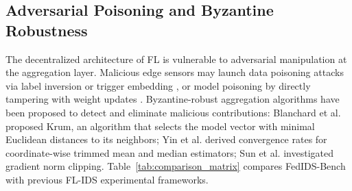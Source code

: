 \documentclass[runningheads]{llncs}
\begin{document}
\subsection{Adversarial Poisoning and Byzantine Robustness}
The decentralized architecture of FL is vulnerable to adversarial manipulation at the aggregation layer. Malicious edge sensors may launch data poisoning attacks via label inversion or trigger embedding \cite{bagdasaryan2020backdoor,tolpegin2020data}, or model poisoning by directly tampering with weight updates \cite{bhagoji2019analyzing,fang2020local}. Byzantine-robust aggregation algorithms have been proposed to detect and eliminate malicious contributions: Blanchard et al. \cite{blanchard2017machine} proposed Krum, an algorithm that selects the model vector with minimal Euclidean distances to its neighbors; Yin et al. \cite{yin2018byzantine} derived convergence rates for coordinate-wise trimmed mean and median estimators; Sun et al. \cite{sun2019can} investigated gradient norm clipping. Table~\ref{tab:comparison_matrix} compares FedIDS-Bench with previous FL-IDS experimental frameworks.

\begin{table}[t]
\caption{Systematic Methodological Comparison: Prior FL-IDS Studies vs. FedIDS-Bench}
\label{tab:comparison_matrix}
\centering
{}
\end{table}
\end{document}
